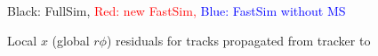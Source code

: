 \documentclass[compress]{beamer}
\begin{document}
\begin{frame}

\small
Black: FullSim, \textcolor{red}{Red: new FastSim,} \textcolor{blue}{Blue: FastSim without MS}

Local $x$ (global $r\phi$) residuals for tracks propagated from tracker to 
\end{frame}
\end{document}

